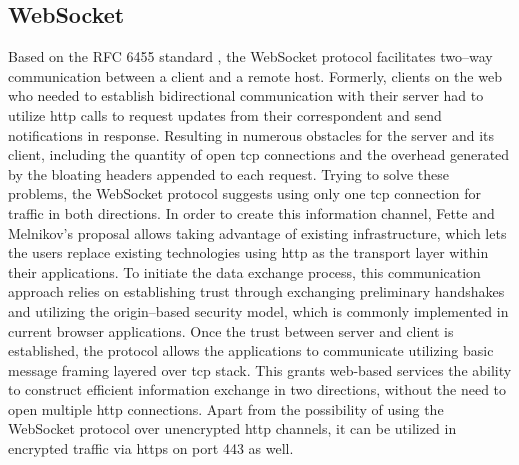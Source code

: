\subsection{WebSocket}
\label{ch:Fundamentals:sec:Data Exchange:ssec:WebSocket}

Based on the RFC 6455 standard \cite{melnikov_websocket_2011}, the WebSocket protocol facilitates two--way communication between a client and a remote host. Formerly, clients on the web who needed to establish bidirectional communication with their server had to utilize \acrshort{http} calls to request updates from their correspondent and send notifications in response.
Resulting in numerous obstacles for the server and its client, including the quantity of open \acrfull{tcp} connections and the overhead generated by the bloating headers appended to each request.
Trying to solve these problems, the WebSocket protocol suggests using only one \acrshort{tcp} connection for traffic in both directions.
In order to create this information channel, Fette and Melnikov's proposal allows taking advantage of existing infrastructure, which lets the users replace existing technologies using \acrshort{http} as the transport layer within their applications.
To initiate the data exchange process, this communication approach relies on establishing trust through exchanging preliminary handshakes and utilizing the origin--based security model, which is commonly implemented in current browser applications.
Once the trust between server and client is established, the protocol allows the applications to communicate utilizing basic message framing layered over \acrshort{tcp} stack. This grants web-based services the ability to construct efficient information exchange in two directions, without the need to open multiple \acrshort{http} connections.
Apart from the possibility of using the WebSocket protocol over unencrypted \acrshort{http} channels, it can be utilized in encrypted traffic via \acrfull{https} on port 443 as well.
